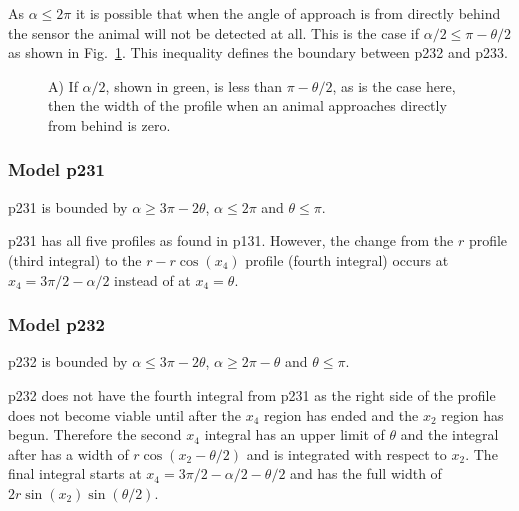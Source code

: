 As $\alpha \le 2\pi$ it is possible that when the angle of approach is from directly behind the sensor the animal will not be detected at all. This is the case if $\alpha/2\le \pi-\theta/2$ as shown in Fig.~\ref{f:p23behind}. This inequality defines the boundary between p232 and p233.

\begin{figure}[t]
        \centering
        \begin{subfigure}[t]{0.4\textwidth}
                \centering
                \caption{}
                \label{f:p23behind}
        \end{subfigure}

\caption{A) If $\alpha/2$, shown in green, is less than $\pi - \theta/2$, as is the case here, then the width of the profile when an animal approaches directly from behind is zero. }
\label{f:p23}
\end{figure}


\subsubsection{Model p231} \label{p231}

p231 is bounded by $\alpha \ge 3\pi - 2\theta$, $\alpha \le 2\pi$ and $\theta\le\pi$.

p231 has all five profiles as found in p131. However, the change from the $r$ profile (third integral) to the $r - r\cos(x_4)$ profile (fourth integral) occurs at $x_4 = 3\pi/2 - \alpha/2$ instead of at $x_4 = \theta$. 




\subsubsection{Model p232} \label{p232}

p232 is bounded by $\alpha \le 3\pi - 2\theta$, $\alpha\ge 2\pi-\theta$ and $\theta\le\pi$.

p232 does not have the fourth integral from p231 as the right side of the profile does not become viable until after the $x_4$ region has ended and the $x_2$ region has begun. Therefore the second $x_4$ integral has an upper limit of $\theta $ and the integral after has a width of $r\cos(x_2 - \theta/2)$ and is integrated with respect to $x_2$. The final integral starts at $x_4 = 3\pi/2 - \alpha/2 - \theta/2$ and has the full width of $2r\sin(x_2)\sin(\theta/2)$.

